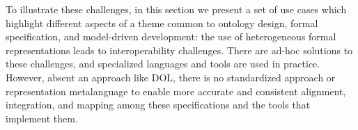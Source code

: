 \documentclass[10pt,%
\ifpretendfinal
final%
\else
draft%
\fi,
]{scrreprt}
\begin{document}
To illustrate these challenges, in this section we present a set of use cases which highlight different aspects of a theme common to ontology design, formal specification, and model-driven development: 
 the use of heterogeneous formal representations leads to interoperability challenges. There 
are ad-hoc solutions to these challenges, and specialized languages and tools are used in practice. 
However, absent an approach like DOL, there is no standardized approach or representation metalanguage to enable more accurate 
and consistent alignment, integration, and mapping among these specifications and the tools that
implement them.



%
\end{document}
